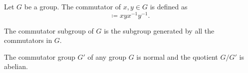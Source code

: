 \begin{definition}\label{def:group_commutator}
  Let \( G \) be a group. The commutator of \( x, y \in G \) is defined as
  \begin{equation*}
    [x, y] \coloneqq xyx^{-1}y^{-1}.
  \end{equation*}

  The commutator subgroup of \( G \) is the subgroup generated by all the commutators in \( G \).
\end{definition}

\begin{proposition}\label{thm:quotient_by_commutator_subgroup}\cite[proposition 7.4]{Knapp2016BAlg}
  The commutator group \( G' \) of any group \( G \) is normal and the quotient \( G / G' \) is abelian.
\end{proposition}
